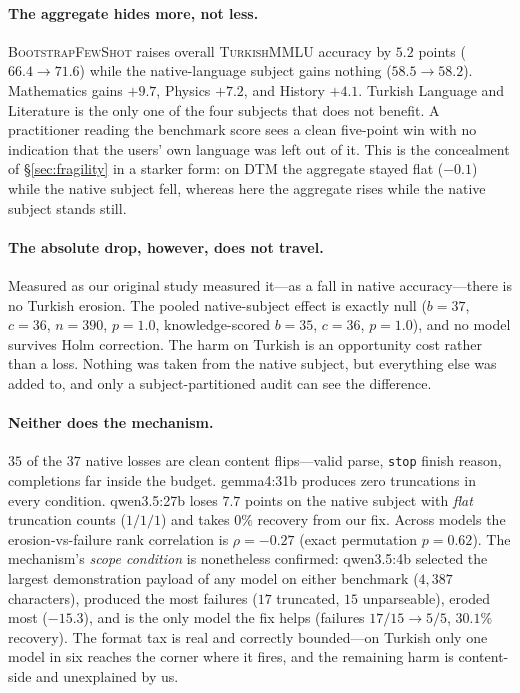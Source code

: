 \documentclass[11pt]{article}
\newcommand{\bsfs}{\textsc{BootstrapFewShot}}
\begin{document}
\paragraph{The aggregate hides more, not less.} \bsfs{} raises overall
\textsc{TurkishMMLU} accuracy by $5.2$ points ($66.4{\to}71.6$) while the
native-language subject gains nothing ($58.5{\to}58.2$). Mathematics gains $+9.7$,
Physics $+7.2$, and History $+4.1$. Turkish Language and Literature is the only one of
the four subjects that does not benefit. A practitioner reading the benchmark score
sees a clean five-point win with no indication that the users' own language was left
out of it. This is the concealment of \S\ref{sec:fragility} in a starker form: on DTM
the aggregate stayed flat ($-0.1$) while the native subject fell, whereas here the
aggregate rises while the native subject stands still.

\paragraph{The absolute drop, however, does not travel.} Measured as our original study
measured it---as a fall in native accuracy---there is no Turkish erosion. The pooled
native-subject effect is exactly null ($b{=}37$, $c{=}36$, $n{=}390$, $p{=}1.0$,
knowledge-scored $b{=}35$, $c{=}36$, $p{=}1.0$), and no model survives Holm correction.
The harm on Turkish is an opportunity cost rather than a loss. Nothing was taken from
the native subject, but everything else was added to, and only a subject-partitioned
audit can see the difference.

\paragraph{Neither does the mechanism.} $35$ of the $37$ native losses are clean content
flips---valid parse, \texttt{stop} finish reason, completions far inside the budget.
gemma4:31b produces zero truncations in every condition. qwen3.5:27b loses $7.7$ points
on the native subject with \emph{flat} truncation counts ($1/1/1$) and takes $0\%$
recovery from our fix. Across models the erosion-vs-failure rank correlation is
$\rho{=}{-}0.27$ (exact permutation $p{=}0.62$). The mechanism's \emph{scope condition}
is nonetheless confirmed: qwen3.5:4b selected the largest demonstration payload of any
model on either benchmark ($4{,}387$ characters), produced the most failures ($17$
truncated, $15$ unparseable), eroded most ($-15.3$), and is the only model the fix helps
(failures $17/15{\to}5/5$, $30.1\%$ recovery). The format tax is real and correctly
bounded---on Turkish only one model in six reaches the corner where it fires, and the
remaining harm is content-side and unexplained by us.
\end{document}
